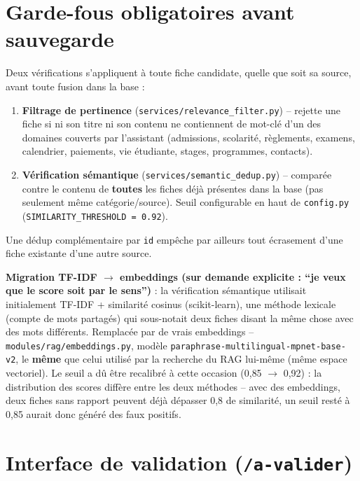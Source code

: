 \documentclass[11pt,a4paper]{report}
\begin{document}
\section{Garde-fous obligatoires avant sauvegarde}
\label{sec:garde-fous}

Deux vérifications s'appliquent à toute fiche candidate, quelle que soit sa source,
avant toute fusion dans la base :
\begin{enumerate}
    \item \textbf{Filtrage de pertinence} (\texttt{services/relevance\_filter.py}) --
    rejette une fiche si ni son titre ni son contenu ne contiennent de mot-clé d'un des
    domaines couverts par l'assistant (admissions, scolarité, règlements, examens,
    calendrier, paiements, vie étudiante, stages, programmes, contacts).
    \item \textbf{Vérification sémantique} (\texttt{services/semantic\_dedup.py}) --
    comparée contre le contenu de \textbf{toutes} les fiches déjà présentes dans la base
    (pas seulement même catégorie/source). Seuil configurable en haut de
    \texttt{config.py} (\texttt{SIMILARITY\_THRESHOLD~=~0.92}).
\end{enumerate}
Une dédup complémentaire par \texttt{id} empêche par ailleurs tout écrasement d'une
fiche existante d'une autre source.

\begin{noteinfo}
\textbf{Migration TF-IDF $\to$ embeddings (sur demande explicite : ``je veux que le
score soit par le sens'')} : la vérification sémantique utilisait initialement TF-IDF +
similarité cosinus (scikit-learn), une méthode lexicale (compte de mots partagés) qui
sous-notait deux fiches disant la même chose avec des mots différents. Remplacée par de
vrais embeddings -- \texttt{modules/rag/embeddings.py}, modèle
\texttt{paraphrase-multilingual-mpnet-base-v2}, le \textbf{même} que celui utilisé par
la recherche du RAG lui-même (même espace vectoriel). Le seuil a dû être recalibré à
cette occasion (0{,}85 $\to$ 0{,}92) : la distribution des scores diffère entre les deux
méthodes -- avec des embeddings, deux fiches sans rapport peuvent déjà dépasser 0{,}8 de
similarité, un seuil resté à 0{,}85 aurait donc généré des faux positifs.
\end{noteinfo}

\section{Interface de validation (\texttt{/a-valider})}
\label{sec:a-valider}
\end{document}
